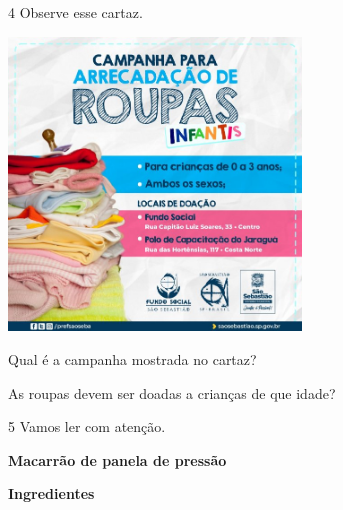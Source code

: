 \num{4} Observe esse cartaz.


\includegraphics[width=3.06414in,height=3.07006in]{media/image83.jpeg}


\begin{escolha}
\item Qual é a campanha mostrada no cartaz?


\item As roupas devem ser doadas a crianças de que idade?

\end{escolha}

\num{5} Vamos ler com atenção.



\textbf{Macarrão de panela de pressão}

\textbf{Ingredientes}

